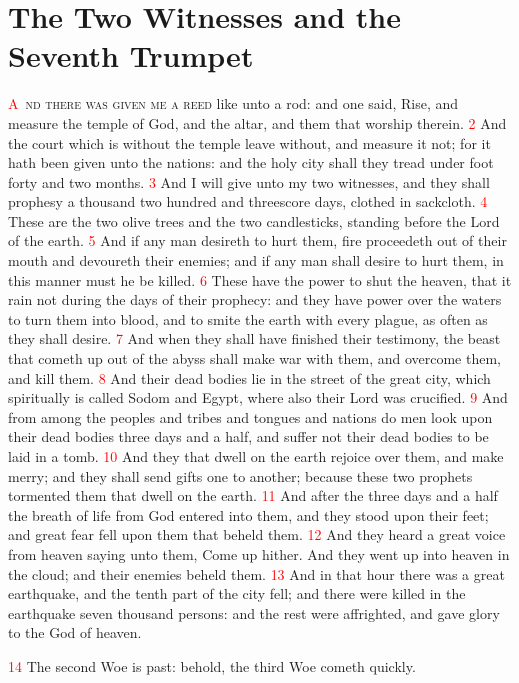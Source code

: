\documentclass[12pt,twoside]{memoir}
\newcommand{\vnum}[1]{\textcolor{red}{\normalsize{#1}}}
\begin{document}
\chapter{The Two Witnesses and the Seventh Trumpet}
\lettrine[lines=3,slope=-0.5em]{\textcolor{red}{A}}{\ nd there was given me a reed} like unto a rod: and one said, Rise, and measure the temple of God, and the altar, and them that worship therein. 
\vnum{2} And the court which is without the temple leave without, and measure it not; for it hath been given unto the nations: and the holy city shall they tread under foot forty and two months. 
\vnum{3} And I will give unto my two witnesses, and they shall prophesy a thousand two hundred and threescore days, clothed in sackcloth. 
\vnum{4} These are the two olive trees and the two candlesticks, standing before the Lord of the earth. 
\vnum{5} And if any man desireth to hurt them, fire proceedeth out of their mouth and devoureth their enemies; and if any man shall desire to hurt them, in this manner must he be killed. 
\vnum{6} These have the power to shut the heaven, that it rain not during the days of their prophecy: and they have power over the waters to turn them into blood, and to smite the earth with every plague, as often as they shall desire. 
\vnum{7} And when they shall have finished their testimony, the beast that cometh up out of the abyss shall make war with them, and overcome them, and kill them. 
\vnum{8} And their dead bodies lie in the street of the great city, which spiritually is called Sodom and Egypt, where also their Lord was crucified. 
\vnum{9} And from among the peoples and tribes and tongues and nations do men look upon their dead bodies three days and a half, and suffer not their dead bodies to be laid in a tomb. 
\vnum{10} And they that dwell on the earth rejoice over them, and make merry; and they shall send gifts one to another; because these two prophets tormented them that dwell on the earth. 
\vnum{11} And after the three days and a half the breath of life from God entered into them, and they stood upon their feet; and great fear fell upon them that beheld them. 
\vnum{12} And they heard a great voice from heaven saying unto them, Come up hither. And they went up into heaven in the cloud; and their enemies beheld them. 
\vnum{13} And in that hour there was a great earthquake, and the tenth part of the city fell; and there were killed in the earthquake seven thousand persons: and the rest were affrighted, and gave glory to the God of heaven.

\vnum{14} The second Woe is past: behold, the third Woe cometh quickly.
\end{document}

